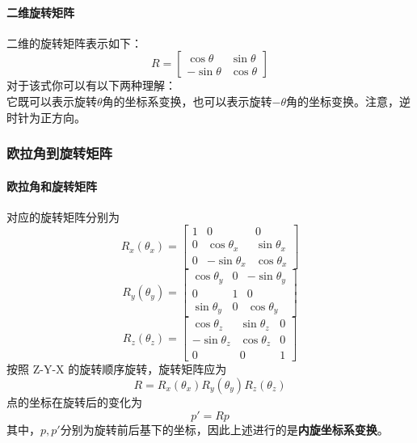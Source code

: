 \documentclass{ctexart}
\begin{document}
	\paragraph{二维旋转矩阵}
	二维的旋转矩阵表示如下：
	\begin{equation}
	R =
	\begin{bmatrix}
	\cos \theta & \sin \theta \\
	-\sin \theta & \cos \theta
	\end{bmatrix}
	\end{equation}
	对于该式你可以有以下两种理解：\\
	它既可以表示旋转$\theta$角的坐标系变换，也可以表示旋转$-\theta$角的坐标变换。注意，逆时针为正方向。
	\subsubsection{欧拉角到旋转矩阵}
	\paragraph{欧拉角和旋转矩阵}
	对应的旋转矩阵分别为
	\begin{equation}
	R_x(\theta_x)=
	\begin{bmatrix}
	1 & 0 & 0 \\
	0 & \cos \theta_x & \sin \theta_x \\
	0 & -\sin \theta_x & \cos \theta_x
	\end{bmatrix}
	\end{equation}
	\begin{equation}
	R_y(\theta_y)=
	\begin{bmatrix}
	\cos \theta_y & 0 & -\sin \theta_y \\
	0 & 1 & 0 \\
	\sin \theta_y & 0 & \cos \theta_y
	\end{bmatrix}
	\end{equation}
	\begin{equation}
	R_z(\theta_z)=
	\begin{bmatrix}
	\cos \theta_z & \sin \theta_z & 0 \\
	-\sin \theta_z & \cos \theta_z & 0 \\
	0 & 0 & 1
	\end{bmatrix}
	\end{equation}
	按照 Z-Y-X 的旋转顺序旋转，旋转矩阵应为
	\begin{equation}
	R=R_x(\theta_x) R_y(\theta_y) R_z(\theta_z)
	\end{equation}
	点的坐标在旋转后的变化为
	\begin{equation}
	p' = R p
	\end{equation}
	其中，$p,p'$分别为旋转前后基下的坐标，因此上述进行的是\textbf{内旋坐标系变换}。
	
\end{document}
